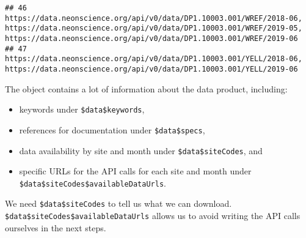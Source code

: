 \documentclass[]{book}
\newenvironment{Shaded}{\begin{snugshade}}{\end{snugshade}}
\newcommand{\CommentTok}[1]{\textcolor[rgb]{0.56,0.35,0.01}{\textit{#1}}}
\newcommand{\KeywordTok}[1]{\textcolor[rgb]{0.13,0.29,0.53}{\textbf{#1}}}
\newcommand{\NormalTok}[1]{#1}
\newcommand{\OperatorTok}[1]{\textcolor[rgb]{0.81,0.36,0.00}{\textbf{#1}}}
\newcommand{\StringTok}[1]{\textcolor[rgb]{0.31,0.60,0.02}{#1}}
\providecommand{\tightlist}{%
  \setlength{\itemsep}{0pt}\setlength{\parskip}{0pt}}
\begin{document}
\begin{verbatim}
## 46                                                                                                                                                                                                                                                                                                                                                                                                                               https://data.neonscience.org/api/v0/data/DP1.10003.001/WREF/2018-06, https://data.neonscience.org/api/v0/data/DP1.10003.001/WREF/2019-05, https://data.neonscience.org/api/v0/data/DP1.10003.001/WREF/2019-06
## 47                                                                                                                                                                                                                                                                                                                                                                                                                                                                                                    https://data.neonscience.org/api/v0/data/DP1.10003.001/YELL/2018-06, https://data.neonscience.org/api/v0/data/DP1.10003.001/YELL/2019-06
\end{verbatim}

The object contains a lot of information about the data product, including:

\begin{itemize}
\tightlist
\item
  keywords under \texttt{\$data\$keywords},
\item
  references for documentation under \texttt{\$data\$specs},
\item
  data availability by site and month under \texttt{\$data\$siteCodes}, and
\item
  specific URLs for the API calls for each site and month under
  \texttt{\$data\$siteCodes\$availableDataUrls}.
\end{itemize}

We need \texttt{\$data\$siteCodes} to tell us what we can download.
\texttt{\$data\$siteCodes\$availableDataUrls} allows us to avoid writing the API
calls ourselves in the next steps.

\begin{Shaded}
\end{Shaded}
\end{document}
